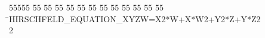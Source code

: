 %
%
\begin{tabbing}
55555 \= 55 \= 55 \= 55 \= 55 \= 55 \= 55 \= 55 \= 55 \= 55 \= 55 \= 55 \= 55 \= \>HIRSCHFELD\_EQUATION\_XYZW=X2*W+X*W2+Y2*Z+Y*Z2\\[0pt]
2\>\end{tabbing}
